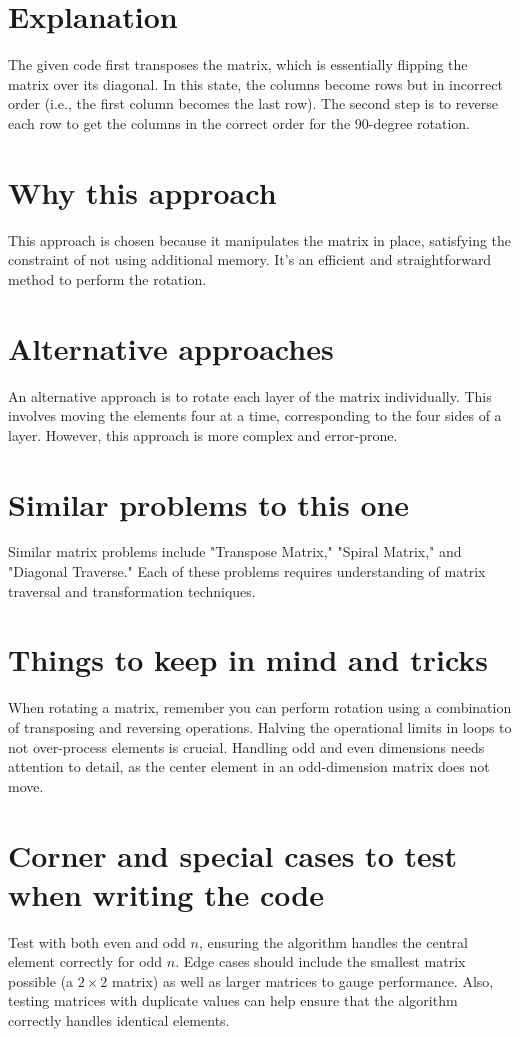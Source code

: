 \section*{Explanation}
The given code first transposes the matrix, which is essentially flipping the matrix over its diagonal. In this state, the columns become rows but in incorrect order (i.e., the first column becomes the last row). The second step is to reverse each row to get the columns in the correct order for the 90-degree rotation.

\section*{Why this approach}
This approach is chosen because it manipulates the matrix in place, satisfying the constraint of not using additional memory. It's an efficient and straightforward method to perform the rotation.

\section*{Alternative approaches}
An alternative approach is to rotate each layer of the matrix individually. This involves moving the elements four at a time, corresponding to the four sides of a layer. However, this approach is more complex and error-prone.

\section*{Similar problems to this one}
Similar matrix problems include "Transpose Matrix," "Spiral Matrix," and "Diagonal Traverse." Each of these problems requires understanding of matrix traversal and transformation techniques.

\section*{Things to keep in mind and tricks}
When rotating a matrix, remember you can perform rotation using a combination of transposing and reversing operations. Halving the operational limits in loops to not over-process elements is crucial. Handling odd and even dimensions needs attention to detail, as the center element in an odd-dimension matrix does not move.

\section*{Corner and special cases to test when writing the code}
Test with both even and odd $n$, ensuring the algorithm handles the central element correctly for odd $n$. Edge cases should include the smallest matrix possible (a $2 \times 2$ matrix) as well as larger matrices to gauge performance. Also, testing matrices with duplicate values can help ensure that the algorithm correctly handles identical elements.